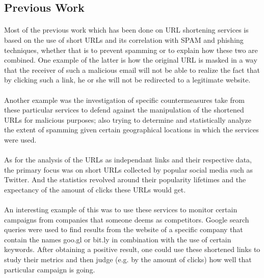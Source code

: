 \documentclass[12pt]{article}
\begin{document}
\subsection{Previous Work}

\paragraph{}
Most of the previous work which has been done on URL shortening services is based on the use of short URLs and its correlation with SPAM and phishing techniques, whether that is to prevent spamming or to explain how these two are combined. One example of the latter is how the original URL is masked in a way that the receiver of such a malicious email will not be able to realize the fact that by clicking such a link, he or she will not be redirected to a legitimate website.
 
\paragraph{}
Another example was the investigation of specific countermeasures take from these particular services to defend against the manipulation of the shortened URLs for malicious purposes; also trying to determine and statistically analyze the extent of spamming given certain geographical locations in which the services were used.

\paragraph{}
 As for the analysis of the URLs as independant links and their respective data, the primary focus was on short URLs collected by popular social media such as Twitter. And the statistics revolved around their popularity lifetimes and the expectancy of the amount of clicks these URLs would get.
 
\paragraph{}
 An interesting example of this was to use these services to monitor certain campaigns from companies that someone deems as competitors. Google search queries were used to find results from the website of a specific company that contain the names goo.gl or bit.ly in combination with the use of certain keywords. After obtaining a positive result, one could use these shortened links to study their metrics and then judge (e.g. by the amount of clicks) how well that particular campaign is going.
\end{document}
